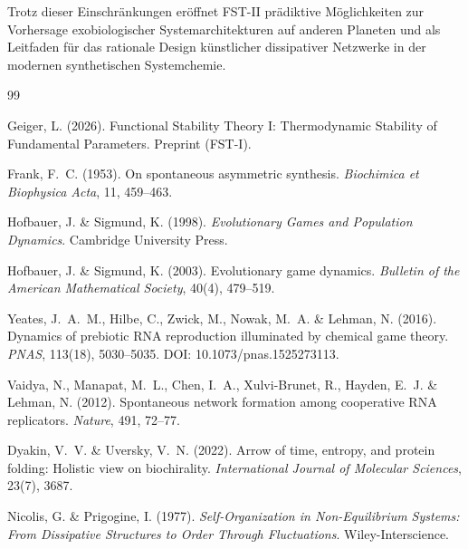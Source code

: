 \documentclass[12pt,a4paper]{article}
\theoremstyle{remark}
\begin{document}
Trotz dieser Einschr\"ankungen er\"offnet FST-II pr\"adiktive M\"oglichkeiten zur Vorhersage exobiologischer Systemarchitekturen auf anderen Planeten und als Leitfaden f\"ur das rationale Design k\"unstlicher dissipativer Netzwerke in der modernen synthetischen Systemchemie.



\begin{thebibliography}{99}

Geiger, L. (2026).
\newblock Functional Stability Theory I: Thermodynamic Stability of Fundamental Parameters.
\newblock Preprint (FST-I).

Frank, F.~C. (1953).
\newblock On spontaneous asymmetric synthesis.
\newblock \textit{Biochimica et Biophysica Acta}, 11, 459--463.

Hofbauer, J. \& Sigmund, K. (1998).
\newblock \textit{Evolutionary Games and Population Dynamics}.
\newblock Cambridge University Press.

Hofbauer, J. \& Sigmund, K. (2003).
\newblock Evolutionary game dynamics.
\newblock \textit{Bulletin of the American Mathematical Society}, 40(4), 479--519.

Yeates, J.~A.~M., Hilbe, C., Zwick, M., Nowak, M.~A. \& Lehman, N. (2016).
\newblock Dynamics of prebiotic RNA reproduction illuminated by chemical game theory.
\newblock \textit{PNAS}, 113(18), 5030--5035.
\newblock DOI: 10.1073/pnas.1525273113.

Vaidya, N., Manapat, M.~L., Chen, I.~A., Xulvi-Brunet, R., Hayden, E.~J. \& Lehman, N. (2012).
\newblock Spontaneous network formation among cooperative RNA replicators.
\newblock \textit{Nature}, 491, 72--77.

Dyakin, V.~V. \& Uversky, V.~N. (2022).
\newblock Arrow of time, entropy, and protein folding: Holistic view on biochirality.
\newblock \textit{International Journal of Molecular Sciences}, 23(7), 3687.

Nicolis, G. \& Prigogine, I. (1977).
\newblock \textit{Self-Organization in Non-Equilibrium Systems: From Dissipative Structures to Order Through Fluctuations}.
\newblock Wiley-Interscience.


\end{thebibliography}
\end{document}
